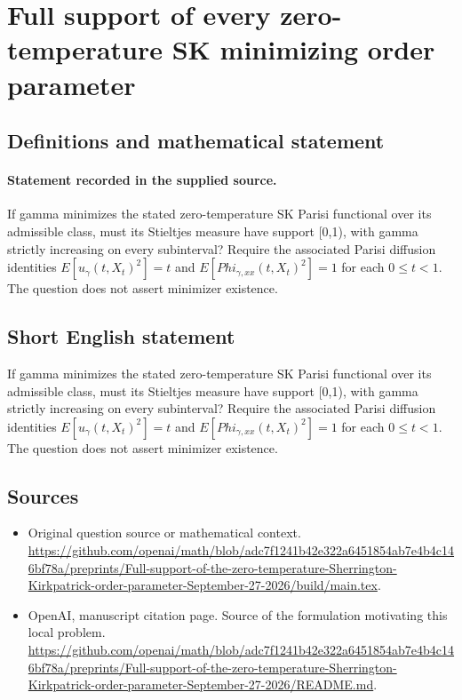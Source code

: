 \documentclass[11pt]{article}
\begin{document}
\section*{Full support of every zero-temperature SK minimizing order parameter}\label{30007246}
\subsection{Definitions and mathematical statement}
\paragraph{Statement recorded in the supplied source.}
If gamma minimizes the stated zero-temperature SK Parisi functional over its admissible class, must its Stieltjes measure have support [0,1), with gamma strictly increasing on every subinterval? Require the associated Parisi diffusion identities $E[u_\gamma (t,X_t)^2]=t$ and $E[Phi_{\gamma ,xx}(t,X_t)^2]=1$ for each $0\leq t<1$. The question does not assert minimizer existence.
\subsection{Short English statement}
If gamma minimizes the stated zero-temperature SK Parisi functional over its admissible class, must its Stieltjes measure have support [0,1), with gamma strictly increasing on every subinterval? Require the associated Parisi diffusion identities $E[u_\gamma (t,X_t)^2]=t$ and $E[Phi_{\gamma ,xx}(t,X_t)^2]=1$ for each $0\leq t<1$. The question does not assert minimizer existence.
\subsection{Sources}
\begin{itemize}
\item[S1] Original question source or mathematical context.
\url{https://github.com/openai/math/blob/adc7f1241b42e322a6451854ab7e4b4c146bf78a/preprints/Full-support-of-the-zero-temperature-Sherrington-Kirkpatrick-order-parameter-September-27-2026/build/main.tex}.
\item[S2] OpenAI, manuscript citation page. Source of the formulation motivating this local problem.
\url{https://github.com/openai/math/blob/adc7f1241b42e322a6451854ab7e4b4c146bf78a/preprints/Full-support-of-the-zero-temperature-Sherrington-Kirkpatrick-order-parameter-September-27-2026/README.md}.
\end{itemize}
\end{document}
